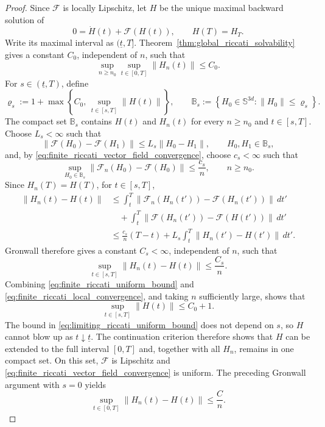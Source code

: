 \documentclass[12pt]{article}
\numberwithin{equation}{section}
\theoremstyle{definition}
\begin{document}
\begin{proof}
Since \(\mathscr F\) is locally Lipschitz, let \(H\) be the unique
maximal backward solution of
\begin{equation}\label{eq:limiting_three_block_riccati}
0=\dot{H}(t)+\mathscr F(H(t)),
\qquad
H(T)=H_T.
\end{equation}
Write its maximal interval as \((\underline t,T]\).
Theorem~\ref{thm:global_riccati_solvability} gives a constant \(C_0\), independent
of \(n\), such that
\begin{equation}\label{eq:finite_riccati_uniform_bound}
\sup_{n\ge n_0}\sup_{t\in[0,T]}\lVert H_n(t)\rVert\le C_0.
\end{equation}
For \(s\in(\underline t,T)\), define
\[
\varrho_s
:=
1+\max\left\{
C_0,\,
\sup_{t\in[s,T]}\lVert H(t)\rVert
\right\},
\qquad
\mathbb B_s
:=
\left\{H_0\in\mathbb S^{3d}:\lVert H_0\rVert\le \varrho_s\right\}.
\]
The compact set \(\mathbb B_s\) contains \(H(t)\) and \(H_n(t)\)
for every \(n\ge n_0\) and \(t\in[s,T]\). Choose \(L_s<\infty\) such that
\[
\lVert \mathscr F(H_0)-\mathscr F(H_1)\rVert
\le
L_s\lVert H_0-H_1\rVert,
\qquad
H_0,H_1\in\mathbb B_s,
\]
and, by \eqref{eq:finite_riccati_vector_field_convergence}, choose
\(c_s<\infty\) such that
\[
\sup_{H_0\in\mathbb B_s}
\lVert \mathscr F_n(H_0)-\mathscr F(H_0)\rVert
\le
\frac{c_s}{n},
\qquad n\ge n_0.
\]
Since
\(H_n(T)=H(T)\), for \(t\in[s,T]\),
\[
\begin{aligned}
\lVert H_n(t)-H(t)\rVert
&\le
\int_t^T
\left\lVert
\mathscr F_n(H_n(t'))-\mathscr F(H_n(t'))
\right\rVert\,dt'
\\
&\quad+
\int_t^T
\left\lVert
\mathscr F(H_n(t'))-\mathscr F(H(t'))
\right\rVert\,dt'
\\
&\le
\frac{c_s}{n}(T-t)
+L_s\int_t^T\lVert H_n(t')-H(t')\rVert\,dt'.
\end{aligned}
\]
Gronwall therefore gives a constant \(C_s<\infty\), independent of
\(n\), such that
\begin{equation}\label{eq:finite_riccati_local_convergence}
\sup_{t\in[s,T]}\lVert H_n(t)-H(t)\rVert
\le\frac{C_s}{n}.
\end{equation}
Combining \eqref{eq:finite_riccati_uniform_bound} and
\eqref{eq:finite_riccati_local_convergence}, and taking \(n\) sufficiently
large, shows that
\begin{equation}\label{eq:limiting_riccati_uniform_bound}
\sup_{t\in[s,T]}\lVert H(t)\rVert\le C_0+1.
\end{equation}
The bound in \eqref{eq:limiting_riccati_uniform_bound} does not depend on
\(s\), so \(H\) cannot blow up as \(t\downarrow\underline t\).
The continuation criterion therefore shows that \(H\)
can be extended to the full interval \([0,T]\) and, together with all \(H_n\), remains in one compact
set. On this set, \(\mathscr F\) is Lipschitz and
\eqref{eq:finite_riccati_vector_field_convergence} is uniform. The preceding
Gronwall argument with \(s=0\) yields
\begin{equation}\label{eq:finite_riccati_limit_to_three_block}
\sup_{t\in[0,T]}\|H_n(t)-H(t)\|
\le
\frac{C}{n}.
\end{equation}


\end{proof}
\end{document}

